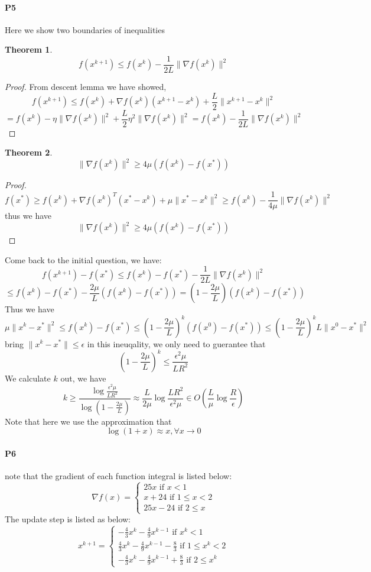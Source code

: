\documentclass[a4 paper,12pt]{article}
\theoremstyle{definitionstyle}
\newtheorem{thm}{Theorem}
\newenvironment{framedminipage}
    {\begin{framed}\begin{minipage}{0.9\textwidth}}
    {\end{minipage}\end{framed}}
\begin{document}
\paragraph{P5}Here we show two boundaries of inequalities
\begin{framedminipage}
\begin{thm}
\[
	f(x^{k+1})\le f(x^k)-\frac{1}{2L}\|\nabla f(x^k)\|^2
\]
\end{thm}
\end{framedminipage}
\begin{proof}
From descent lemma we have showed,
\[
	f(x^{k+1})\le f(x^k)+\nabla f(x^k)(x^{k+1}-x^k)+\frac{L}{2}\|x^{k+1}-x^k\|^2
\]
\[
	=f(x^k)-\eta\|\nabla f(x^k)\|^2+\frac{L}{2}\eta^2\|\nabla f(x^k)\|^2=f(x^k)-\frac{1}{2L}\|\nabla f(x^k)\|^2
\]
\end{proof}
\begin{framedminipage}
\begin{thm}
\[
	\|\nabla f(x^k)\|^2\ge 4\mu\left(f(x^k)-f(x^*)\right) 
\]
\end{thm}
\end{framedminipage}
\begin{proof}
\[
	f(x^*)\ge f(x^k)+\nabla f(x^k)^T(x^*-x^k)+\mu\|x^*-x^k\|^2\ge f(x^k)-\frac{1}{4\mu}\|\nabla f(x^k)\|^2
\]
thus we have
\[
	\|\nabla f(x^k)\|^2\ge 4\mu\left(f(x^k)-f(x^*)\right) 
\]
\end{proof}
Come back to the initial question, we have:
\[
	f(x^{k+1})-f(x^*)\le f(x^k)-f(x^*)-\frac{1}{2L}\|\nabla f(x^k)\|^2
\]
\[
	\le f(x^k)-f(x^*)-\frac{2\mu}{L}\left(f(x^k)-f(x^*)\right)=(1-\frac{2\mu}{L})\left(f(x^k)-f(x^*)\right)
\]
Thus we have
\[
	\mu\|x^k-x^*\|^2\le f(x^k)-f(x^*)\le(1-\frac{2\mu}{L})^k(f(x^0)-f(x^*))\le (1-\frac{2\mu}{L})^kL\|x^0-x^*\|^2
\]
bring $\|x^k-x^*\|\le\epsilon$ in this ineuqality, we only need to guerantee that
\[
	(1-\frac{2\mu}{L})^k\le\frac{\epsilon^2\mu}{LR^2}
\]
We calculate $k$ out, we have
\[
	k\ge\frac{\log \frac{\epsilon^2\mu}{LR^2}}{\log(1-\frac{2\mu}{L})}\approx\frac{L}{2\mu}\log\frac{LR^2}{\epsilon^2\mu}\in O(\frac{L}{\mu}\log\frac{R}{\epsilon})
\]
Note that here we use the approximation that
\[
	\log(1+x)\approx x,\forall x\to 0
\]
\paragraph{P6}
note that the gradient of each function integral is listed below:
\[
  \nabla f(x)=\begin{cases}
    25x \text{ if }x<1\\
    x+24 \text{ if }1\le x<2\\
    25x-24 \text{ if }2\le x
  \end{cases}
\]
The update step is listed as below:
\[
  x^{k+1}=\begin{cases}
    -\frac{4}{3}x^k-\frac{4}{9}x^{k-1}\text{ if }x^k<1\\
    \frac{4}{3}x^k-\frac{4}{9}x^{k-1}-\frac{8}{3}\text{ if }1\le x^k<2\\
    -\frac{4}{3}x^k-\frac{4}{9}x^{k-1}+\frac{8}{3}\text{ if }2\le x^k
  \end{cases}
\]
\end{document}
